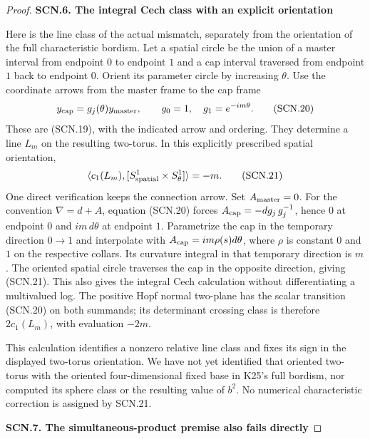 \begin{proof}
\par

\medskip\noindent\textbf{SCN.6. The integral Cech class with an explicit orientation}

\par\nobreak

Here is the line class of the actual mismatch, separately
from the orientation of the full characteristic bordism.
Let a spatial circle be the union of a master interval
from endpoint \(0\) to endpoint \(1\) and a cap interval
traversed from endpoint \(1\) back to endpoint \(0\).
Orient its parameter circle by increasing \(\theta\).
Use the coordinate arrows from the master frame to the
cap frame
\[
        y_{\rm cap}=g_j(\theta)y_{\rm master},\qquad
                 g_0=1,\quad g_1=e^{-im\theta}.
                                                        \tag{SCN.20}
\]
These are (SCN.19), with the indicated arrow and ordering.
They determine a line \(L_m\) on the resulting two-torus.
In this explicitly prescribed spatial orientation,
\[
       \langle c_1(L_m),[S^1_{\rm spatial}
                              \times S^1_\theta]\rangle=-m.
                                                        \tag{SCN.21}
\]
One direct verification keeps the connection arrow.
Set \(A_{\rm master}=0\). For the convention
\(\nabla=d+A\), equation (SCN.20) forces
\(A_{\rm cap}=-dg_j\,g_j^{-1}\), hence \(0\) at endpoint
\(0\) and \(im\,d\theta\) at endpoint \(1\).
Parametrize the cap in the temporary direction \(0\to1\)
and interpolate with \(A_{\rm cap}=im\rho(s)d\theta\),
where \(\rho\) is constant \(0\) and \(1\) on the
respective collars. Its curvature integral in that
temporary direction is \(m\). The oriented spatial
circle traverses the cap in the opposite direction,
giving (SCN.21). This also gives the integral Cech
calculation without differentiating a multivalued log.
The positive Hopf normal two-plane has the scalar
transition (SCN.20) on both summands; its determinant
crossing class is therefore \(2c_1(L_m)\), with
evaluation \(-2m\).

This calculation identifies a nonzero relative line
class and fixes its sign in the displayed two-torus
orientation. We have not yet identified that oriented
two-torus with the oriented four-dimensional fixed
base in K25's full bordism, nor computed its sphere
class or the resulting value of \(b^2\). No numerical
characteristic correction is assigned by SCN.21.

\par

\medskip\noindent\textbf{SCN.7. The simultaneous-product premise also fails directly}


\end{proof}
